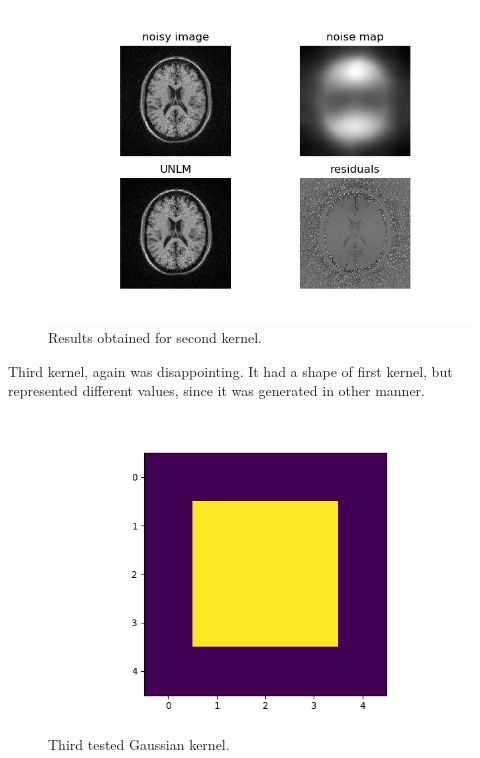 \begin{figure}[H]
	\centering{}
	\includegraphics[scale=0.8]{figures/module05/gk2results}
	\caption{Results obtained for second kernel.} 
\end{figure}  

Third kernel, again was disappointing. It had a shape of first kernel, but represented different values, since it was generated in other manner.

\begin{figure}[H]
	\centering{}
	\includegraphics[scale=0.7]{figures/module05/gk3}
	\caption{Third tested Gaussian kernel.} 
\end{figure}

